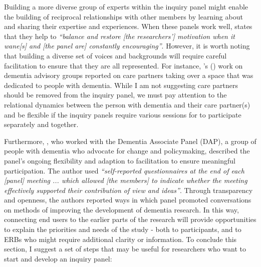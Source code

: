 Building a more diverse group of experts within the inquiry panel might enable the building of reciprocal relationships with other members by learning about and sharing their expertise and experiences. When these panels work well, \cite{appleton2011critical} states that they help to \textit{``balance and restore [the researchers'] motivation when it wane[s] and [the panel are] constantly encouraging''}. However, it is worth noting that building a diverse set of voices and backgrounds will require careful facilitation to ensure that they are all represented. For instance, \citeauthor{wiersma2016creating}'s (\citeyear{wiersma2016creating}) work on dementia advisory groups reported on care partners taking over a space that was dedicated to people with dementia. While I am not suggesting care partners should be removed from the inquiry panel, we must pay attention to the relational dynamics between the person with dementia and their care partner(s) and be flexible if the inquiry panels require various sessions for to participate separately and together.

Furthermore, \cite{innes2021s}, who worked with the Dementia Associate Panel (DAP), a group of people with dementia who advocate for change and policymaking, described the panel's ongoing flexibility and adaption to facilitation to ensure meaningful participation. The author used \textit{``self-reported questionnaires at the end of each [panel] meeting ... which allowed [the members] to indicate whether the meeting effectively supported their contribution of view and ideas''}. Through transparency and openness, the authors reported ways in which panel promoted conversations on methods of improving the development of dementia research. In this way, connecting end users to the earlier parts of the research will provide opportunities to explain the priorities and needs of the study - both to participants, and to ERBs who might require additional clarity or information. To conclude this section, I suggest a set of steps that may be useful for researchers who want to start and develop an inquiry panel:

